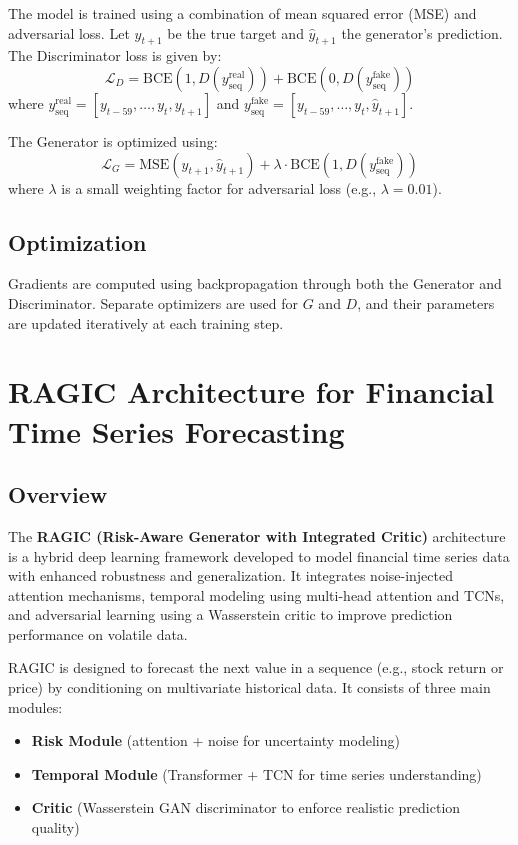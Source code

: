 The model is trained using a combination of mean squared error (MSE) and adversarial loss. Let $y_{t+1}$ be the true target and $\hat{y}_{t+1}$ the generator's prediction. The Discriminator loss is given by:
\[
\mathcal{L}_D = \text{BCE}(1, D(y_{\text{seq}}^{\text{real}})) + \text{BCE}(0, D(y_{\text{seq}}^{\text{fake}}))
\]
where $y_{\text{seq}}^{\text{real}} = [y_{t-59}, \dots, y_t, y_{t+1}]$ and $y_{\text{seq}}^{\text{fake}} = [y_{t-59}, \dots, y_t, \hat{y}_{t+1}]$.

The Generator is optimized using:
\[
\mathcal{L}_G = \text{MSE}(y_{t+1}, \hat{y}_{t+1}) + \lambda \cdot \text{BCE}(1, D(y_{\text{seq}}^{\text{fake}}))
\]
where $\lambda$ is a small weighting factor for adversarial loss (e.g., $\lambda = 0.01$).

\subsection{Optimization}

Gradients are computed using backpropagation through both the Generator and Discriminator. Separate optimizers are used for $G$ and $D$, and their parameters are updated iteratively at each training step.

\section{RAGIC Architecture for Financial Time Series Forecasting}

\subsection{Overview}

The \textbf{RAGIC (Risk-Aware Generator with Integrated Critic)} architecture is a hybrid deep learning framework developed to model financial time series data with enhanced robustness and generalization. It integrates noise-injected attention mechanisms, temporal modeling using multi-head attention and TCNs, and adversarial learning using a Wasserstein critic to improve prediction performance on volatile data.

RAGIC is designed to forecast the next value in a sequence (e.g., stock return or price) by conditioning on multivariate historical data. It consists of three main modules:
\begin{itemize}
    \item \textbf{Risk Module} (attention + noise for uncertainty modeling)
    \item \textbf{Temporal Module} (Transformer + TCN for time series understanding)
    \item \textbf{Critic} (Wasserstein GAN discriminator to enforce realistic prediction quality)
\end{itemize}

